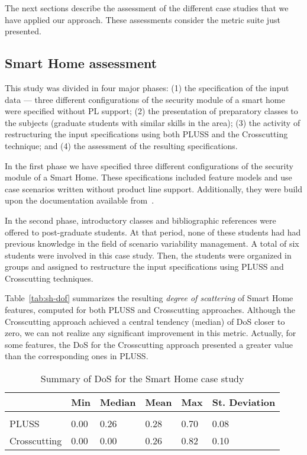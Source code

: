 The next sections describe the assessment of the different case studies that we
have applied our approach. These assessments consider the metric suite just
presented.

\subsection{Smart Home assessment}

This study was divided in four major phases: (1) the specification of the input
data --- three different configurations of the security module of a smart home
were specified without PL support; (2) the presentation of preparatory classes to the subjects
(graduate students with similar skills in the area); (3) the activity of
restructuring the input specifications using both PLUSS and the Crosscutting
technique; and (4) the assessment of the resulting specifications.

In the first phase we have specified three different configurations of the
security module of a Smart Home. These specifications included feature models and
use case scenarios written without product line support. Additionally, they were
build upon the documentation available from~\cite{Pohl:2005aa,AMPLE}.

In the second phase, introductory classes and bibliographic references were
offered to post-graduate students. At that period, none of these students had had
previous knowledge in the field of scenario variability management. A total of
six students were involved in this case study. Then, the students were organized
in groups and assigned to restructure the input specifications using PLUSS and
Crosscutting techniques.


Table~\ref{tab:sh-dof} summarizes the resulting \emph{degree of scattering} of
Smart Home features, computed for both PLUSS and Crosscutting approaches. Although the
Crosscutting approach achieved a central tendency (median) of DoS closer to
zero, we can not realize any significant improvement in this metric. Actually, for some
features, the DoS for the Crosscutting approach presented a greater value than
the corresponding ones in PLUSS.

\begin{table}[htb]
\centering
\caption{Summary of DoS for the Smart Home case study}
\label{tab:sh-dos}
\begin{small}
\begin{tabular}{llllll} \hline
					& Min 	& Median 	& Mean 	& Max 	& St. Deviation \\ \hline \\
	PLUSS			& 0.00  & 0.26   	& 0.28  & 0.70 	& 0.08 			\\
	Crosscutting	& 0.00  & 0.00  	& 0.26 	& 0.82 & 0.10  		\\ \hline	
\end{tabular}
\end{small}
\end{table}

